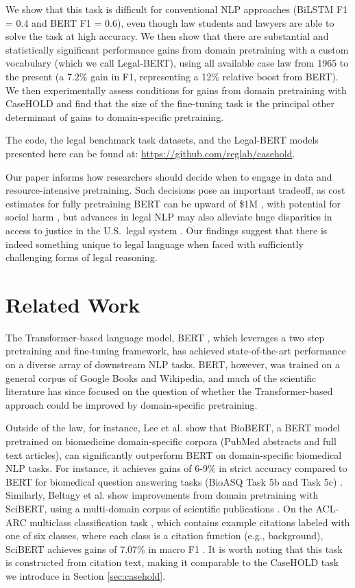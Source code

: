 \documentclass[sigconf]{acmart}
\begin{document}
We show that this task is difficult for conventional NLP approaches (BiLSTM F1 = 0.4 and BERT F1 = 0.6), even though law students and lawyers are able to solve the task at high accuracy. We then show that there are substantial and statistically significant performance gains from domain pretraining with a custom vocabulary (which we call Legal-BERT), using all available case law from 1965 to the present (a 7.2\% gain in F1, representing a 12\% relative boost from BERT). We then experimentally assess conditions for gains from domain pretraining with CaseHOLD and find that the size of the fine-tuning task is the principal other determinant of gains to domain-specific pretraining.

The code, the legal benchmark task datasets, and the Legal-BERT models presented here can be found at: \url{https://github.com/reglab/casehold}.

Our paper informs how researchers should decide when to engage in data and resource-intensive pretraining. Such decisions pose an important tradeoff, as cost estimates for fully pretraining BERT can be upward of \$1M  \cite{sharir2020cost}, with potential for social harm \cite{Ben:Geb:McM:21}, but advances in legal NLP may also alleviate huge disparities in access to justice in the U.S.\ legal system \cite{queudot2020improving, wu, engstrom}. Our findings suggest that there is indeed something unique to legal language when faced with sufficiently challenging forms of legal reasoning. 

\section{Related Work}
The Transformer-based language model, BERT \cite{devlin-etal-2019-bert}, which leverages a two step pretraining and fine-tuning framework, has achieved state-of-the-art performance on a diverse array of downstream NLP tasks.  BERT, however, was trained on a general corpus of Google Books and Wikipedia, and much of the scientific literature has since focused on the question of whether the Transformer-based approach could be improved by domain-specific pretraining. 

Outside of the law, for instance, Lee et al. \cite{lee_biobert_2019} show that BioBERT, a BERT model pretrained on biomedicine domain-specific corpora (PubMed abstracts and full text articles), can significantly outperform BERT on domain-specific biomedical NLP tasks.  For instance, it achieves gains of 6-9\% in strict accuracy compared to BERT \cite{lee_biobert_2019} for biomedical question answering tasks (BioASQ Task 5b and Task 5c) \cite{tsatsaronis_overview_2015}. Similarly, Beltagy et al. show improvements from domain pretraining with SciBERT, using a multi-domain corpus of scientific publications \cite{beltagy-etal-2019-scibert}.  On the ACL-ARC multiclass classification task \cite{jurgens-etal-2018-measuring}, which contains example citations labeled with one of six classes, where each class is a citation function (e.g., background), SciBERT achieves gains of 7.07\% in macro F1 \cite{beltagy-etal-2019-scibert}. It is worth noting that this task is constructed from citation text, making it comparable to the CaseHOLD task we introduce in Section \ref{sec:casehold}.
\end{document}

